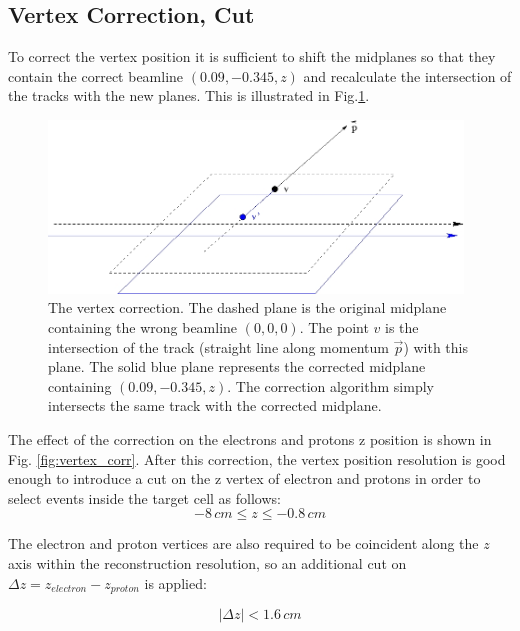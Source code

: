 \clearpage\newpage

\subsection{Vertex Correction, Cut}
To correct the vertex position it is sufficient to shift the midplanes
so that they contain the correct beamline $(0.09, -0.345, z)$ and recalculate 
the intersection of the tracks with the new planes.
This is illustrated in Fig.\ref{fig:vertex}.

\begin{figure}[h]
	\centering
		\includegraphics[width=0.98\textwidth ]{img/corr_vertex.jpg}
			\caption{The vertex correction. The dashed plane is the original midplane
						containing the wrong beamline $(0, 0, 0)$. The point $v$ is the 
						intersection of the track (straight line along momentum $\vec p$)
						with this plane. The solid blue plane represents the corrected
						midplane containing $(0.09, -0.345, z)$. The correction algorithm 
						simply intersects the same track with the corrected midplane. }
			\label{fig:vertex}
\end{figure}


\vspace{1cm}
The effect of the correction on the electrons and protons z position
is shown in Fig. \ref{fig:vertex_corr}. 
After this correction, the vertex position resolution is good enough to
introduce a cut on the z vertex of electron and protons in order to
select events inside the target cell as follows:
\begin{equation}
 -8\, cm \le z \le -0.8\, cm
\label{eqn:vertex_cut1} 
\end{equation}

The electron and proton vertices are also required to be coincident along the $z$ axis
within the reconstruction resolution, so an additional cut on
$\Delta z = z_{electron} - z_{proton}$ is applied:

\begin{equation}
 \left| \Delta z \right| < 1.6 \,cm
 \label{eqn:vertex_cut2} 
\end{equation}

